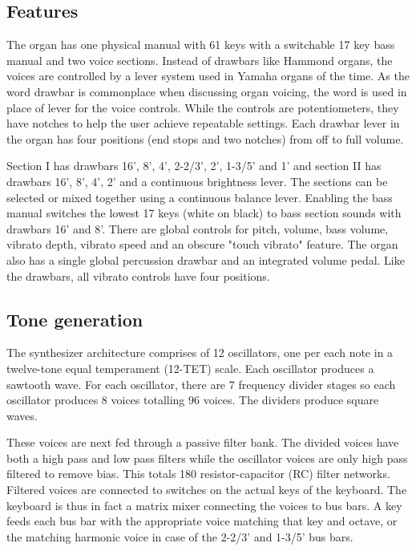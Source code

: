 \documentclass[11pt,a4paper]{article}
\begin{document}
\subsection{Features}

The organ has one physical manual with 61 keys with a switchable 17 key bass manual and two voice sections. Instead of drawbars like Hammond organs, the voices are controlled by a lever system used in Yamaha organs of the time. As the word drawbar is commonplace when discussing organ voicing, the word is used in place of lever for the voice controls. While the controls are potentiometers, they have notches to help the user achieve repeatable settings. Each drawbar lever in the organ has four positions (end stops and two notches) from off to full volume. 

Section I has drawbars 16', 8', 4', 2-2/3', 2', 1-3/5' and 1' and section II has drawbars 16', 8', 4', 2' and a continuous brightness lever. The sections can be selected or mixed together using a continuous balance lever. Enabling the bass manual switches the lowest 17 keys (white on black) to bass section sounds with drawbars 16' and 8'. There are global controls for pitch, volume, bass volume, vibrato depth, vibrato speed and an obscure "touch vibrato" feature. The organ also has a single global percussion drawbar and an integrated volume pedal. Like the drawbars, all vibrato controls have four positions.

\subsection{Tone generation}

The synthesizer architecture comprises of 12 oscillators, one per each note in a twelve-tone equal temperament (12-TET) scale. Each oscillator produces a sawtooth wave. For each oscillator, there are 7 frequency divider stages so each oscillator produces 8 voices totalling 96 voices. The dividers produce square waves. 

These voices are next fed through a passive filter bank. The divided voices have both a high pass and low pass filters while the oscillator voices are only high pass filtered to remove bias. This totals 180 resistor-capacitor (RC) filter networks. Filtered voices are connected to switches on the actual keys of the keyboard. The keyboard is thus in fact a matrix mixer connecting the voices to bus bars. A key feeds each bus bar with the appropriate voice matching that key and octave, or the matching harmonic voice in case of the 2-2/3' and 1-3/5' bus bars. 
\end{document}
